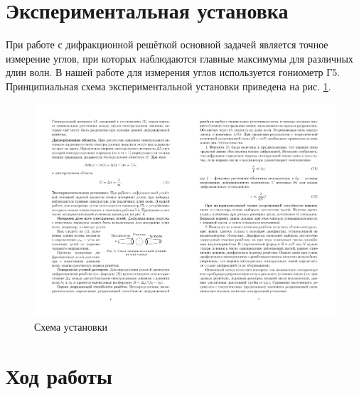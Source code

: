 \documentclass[a4paper,12pt]{article} %
\begin{document}
\section{Экспериментальная установка}

При работе с дифракционной решёткой основной задачей является точное измерение углов, при которых наблюдаются главные максимумы для различных длин волн. В нашей работе для измерения углов используется гониометр Г5. Принципиальная схема экспериментальной установки приведена на рис. \ref{inst}.
\begin{figure}[H]
	\label{inst}
	\begin{center}
	    \includegraphics[scale=1.5]{inst.pdf}
	\end{center}
	\caption{Схема установки}
\end{figure}

\section{Ход работы}
\end{document}
